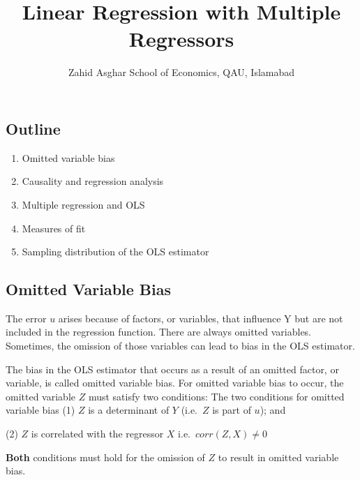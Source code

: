 \documentclass[
  letterpaper,
  DIV=11,
  numbers=noendperiod]{scrartcl}
\title{Linear Regression with Multiple Regressors}
\author{Zahid Asghar School of Economics, QAU, Islamabad}
\date{}
\begin{document}
\maketitle
\hypertarget{outline}{%
\subsection{Outline}\label{outline}}

\begin{enumerate}
\def\labelenumi{\arabic{enumi}.}
\item
  Omitted variable bias
\item
  Causality and regression analysis
\item
  Multiple regression and OLS
\item
  Measures of fit\\
\item
  Sampling distribution of the OLS estimator
\end{enumerate}

\hypertarget{omitted-variable-bias}{%
\subsection{Omitted Variable Bias}\label{omitted-variable-bias}}

The error \(u\) arises because of factors, or variables, that influence
Y but are not included in the regression function. There are always
omitted variables. Sometimes, the omission of those variables can lead
to bias in the OLS estimator.

The bias in the OLS estimator that occurs as a result of an omitted
factor, or variable, is called omitted variable bias. For omitted
variable bias to occur, the omitted variable \(Z\) must satisfy two
conditions: The two conditions for omitted variable bias (1) \(Z\) is a
determinant of \(Y\) (i.e.~\(Z\) is part of \(u\)); and

(2) \(Z\) is correlated with the regressor \(X\)
i.e.~\(corr(Z,X) \neq 0\)

\textbf{Both} conditions must hold for the omission of \(Z\) to result
in omitted variable bias.

\hypertarget{section}{%
\subsection{}\label{section}}
\end{document}
